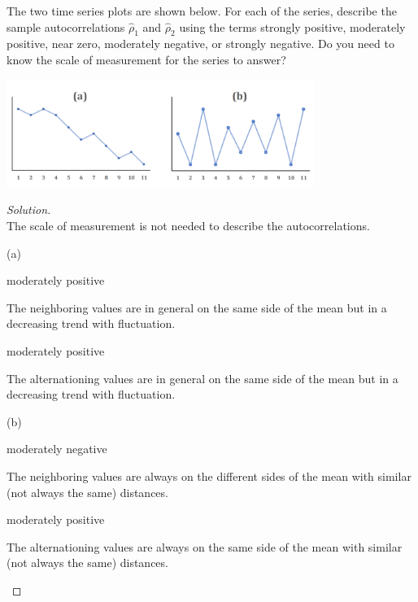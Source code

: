 \documentclass[UTF8,a4paper,14pt]{ctexart}
\newenvironment{solution}
  {\renewcommand\qedsymbol{$\blacksquare$}\begin{proof}[Solution]}
  {\end{proof}}
\theoremstyle{definition}
\theoremstyle{remark}
\begin{document}
\begin{Problem}{}
  The two time series plots are shown below. For each of the series, describe the sample autocorrelations
  \(\hat{\rho}_1\) and \(\hat{\rho}_2\) using the terms strongly positive, moderately positive, near zero, moderately negative, or strongly negative. Do you need to know the scale of measurement for the series to answer?
  
\end{Problem}

\centering\includegraphics[height=3.5cm]{Q1}

\begin{solution}\,\\
  The scale of measurement is not needed to describe the autocorrelations.

  \begin{mybox}{(a)}
    
    
      moderately positive  

      The neighboring values are in general on the same side of the mean but in a decreasing trend with fluctuation.

    moderately positive  

    The alternationing values are in general on the same side of the mean but in a decreasing trend with fluctuation.
  \end{mybox}
  \begin{mybox}{(b)}
    

    moderately negative

    The neighboring values are always on the different sides of the mean with similar (not always the same) distances.

    moderately positive  

    The alternationing values are always on the same side of the mean with similar (not always the same) distances.  
  \end{mybox}
\end{solution}
\end{document}
